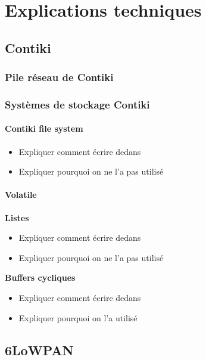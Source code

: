 \chapter{Explications techniques}
\label{sec:technique}

\section{Contiki}

	\subsection{Pile réseau de Contiki}
	
	\subsection{Systèmes de stockage Contiki}
	
		\subsubsection{Contiki file system}
			\begin{itemize}
				\item Expliquer comment écrire dedans
				\item Expliquer pourquoi on ne l'a pas utilisé
			\end{itemize}
		\subsubsection{Volatile}
			\textbf{Listes}
			\begin{itemize}
				\item Expliquer comment écrire dedans
				\item Expliquer pourquoi on ne l'a pas utilisé
			\end{itemize}
			\textbf{Buffers cycliques}
			\begin{itemize}
				\item Expliquer comment écrire dedans
				\item Expliquer pourquoi on l'a utilisé
			\end{itemize}
		
	
\section{6LoWPAN}
